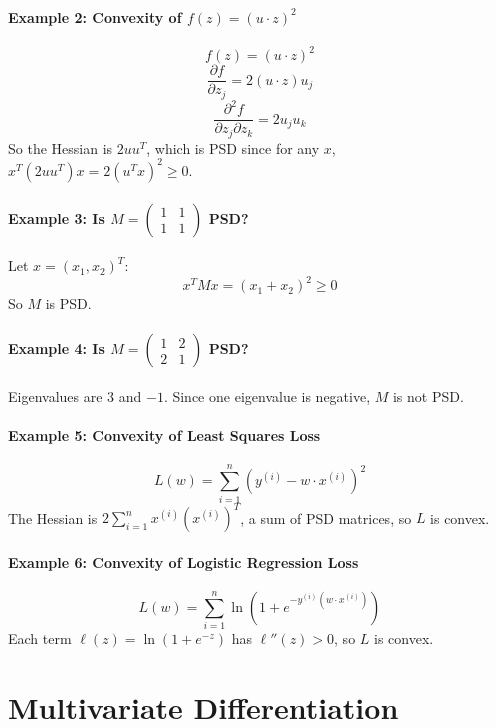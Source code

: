 \documentclass{article}
\begin{document}
\paragraph{Example 2: Convexity of $f(z) = (u \cdot z)^2$}
\[
f(z) = (u \cdot z)^2
\]
\[
\frac{\partial f}{\partial z_j} = 2(u \cdot z)u_j
\]
\[
\frac{\partial^2 f}{\partial z_j \partial z_k} = 2u_j u_k
\]
So the Hessian is $2uu^T$, which is PSD since for any $x$, $x^T (2uu^T) x = 2(u^T x)^2 \geq 0$.

\paragraph{Example 3: Is $M = \begin{pmatrix} 1 & 1 \\ 1 & 1 \end{pmatrix}$ PSD?}
Let $x = (x_1, x_2)^T$:
\[
x^T M x = (x_1 + x_2)^2 \geq 0
\]
So $M$ is PSD.

\paragraph{Example 4: Is $M = \begin{pmatrix} 1 & 2 \\ 2 & 1 \end{pmatrix}$ PSD?}
Eigenvalues are $3$ and $-1$. Since one eigenvalue is negative, $M$ is not PSD.

\paragraph{Example 5: Convexity of Least Squares Loss}
\[
L(w) = \sum_{i=1}^n (y^{(i)} - w \cdot x^{(i)})^2
\]
The Hessian is $2\sum_{i=1}^n x^{(i)}(x^{(i)})^T$, a sum of PSD matrices, so $L$ is convex.

\paragraph{Example 6: Convexity of Logistic Regression Loss}
\[
L(w) = \sum_{i=1}^n \ln(1 + e^{-y^{(i)}(w \cdot x^{(i)})})
\]
Each term $\ell(z) = \ln(1 + e^{-z})$ has $\ell''(z) > 0$, so $L$ is convex.
\section{Multivariate Differentiation}
\end{document}
